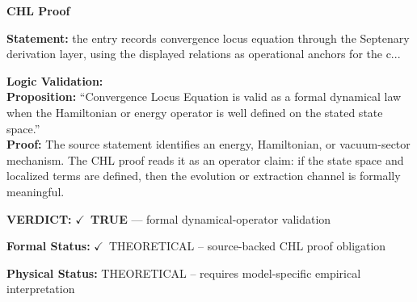 \vspace{0.45em}
\noindent\textbf{CHL Proof}\par
\textbf{Statement:} the entry records convergence locus equation through the Septenary derivation layer,
using the displayed relations as operational anchors for the c...

\textbf{Logic Validation:}\\
\textbf{Proposition:} ``Convergence Locus Equation is valid as a formal dynamical law when the Hamiltonian or
energy operator is well defined on the stated state space.''\\
\textbf{Proof:} The source statement identifies an energy, Hamiltonian, or vacuum-sector mechanism. The
CHL proof reads it as an operator claim: if the state space and localized terms are
defined, then the evolution or extraction channel is formally meaningful.

\textbf{VERDICT:} \ensuremath{\checkmark}\ \textbf{TRUE} --- formal dynamical-operator validation

\textbf{Formal Status:} \ensuremath{\checkmark}\ THEORETICAL -- source-backed CHL proof obligation

\textbf{Physical Status:} THEORETICAL -- requires model-specific empirical interpretation
\par\vspace{0.45em}
\par
\ifTZPDarkEdition
{}
\fi
\endgroup
\endgroup
